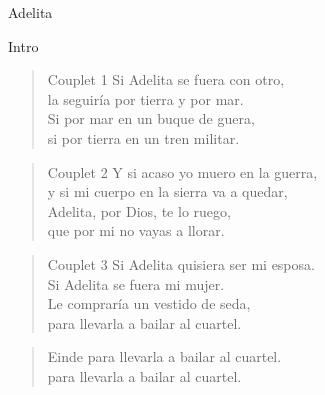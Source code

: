\begin{song}{Adelita}

\begin{instrumental}{Intro}
 \measure{}  \measure{}  \measure{}  
 \measure{}  \measure{}  \measure{}  
\end{instrumental}

\begin{verse}{Couplet 1}
Si Adelita se fuera con otro,\\
la seguir\'ia por tierra y por mar.\\
Si por mar en un buque de guera,\\
si por tierra en un tren militar.\\
\end{verse}

\begin{verse}{Couplet 2}
Y si acaso yo muero en la guerra,\\
y si mi cuerpo en la sierra va a quedar,\\
Adelita, por Dios, te lo ruego,\\
que por mi no vayas a llorar.\\
\end{verse}

\begin{verse}{Couplet 3}
Si Adelita quisiera ser mi esposa.\\
Si Adelita se fuera mi mujer.\\
Le comprar\'ia un vestido de seda,\\
para llevarla a bailar al cuartel.\\
\end{verse}

\begin{verse}{Einde}
para llevarla a bailar al cuartel.\\
para llevarla a bailar al cuartel.\\
\end{verse}
\end{song}
